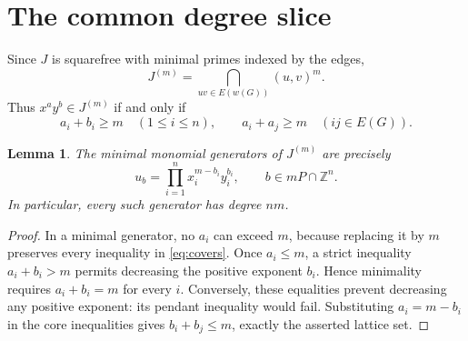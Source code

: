 \documentclass[11pt]{article}
\newtheorem{lemma}[theorem]{Lemma}
\theoremstyle{remark}
\newcommand{\ZZ}{\mathbb Z}
\begin{document}
\section{The common degree slice}

Since $J$ is squarefree with minimal primes indexed by the edges,
\[
J^{(m)}=\bigcap_{uv\in E(w(G))}(u,v)^m.
\]
Thus $x^ay^b\in J^{(m)}$ if and only if
\begin{equation}\label{eq:covers}
a_i+b_i\geq m\quad(1\leq i\leq n),\qquad
a_i+a_j\geq m\quad(ij\in E(G)).
\end{equation}

\begin{lemma}\label{lem:generators}
The minimal monomial generators of $J^{(m)}$ are precisely
\[
u_b=\prod_{i=1}^n x_i^{m-b_i}y_i^{b_i},
\qquad b\in mP\cap\ZZ^n.
\]
In particular, every such generator has degree $nm$.
\end{lemma}
\begin{proof}
In a minimal generator, no $a_i$ can exceed $m$, because replacing it by
$m$ preserves every inequality in \eqref{eq:covers}. Once $a_i\leq m$,
a strict inequality $a_i+b_i>m$ permits decreasing the positive exponent
$b_i$. Hence minimality requires $a_i+b_i=m$ for every $i$.
Conversely, these equalities prevent decreasing any positive exponent:
its pendant inequality would fail. Substituting $a_i=m-b_i$ in the core
inequalities gives $b_i+b_j\leq m$, exactly the asserted lattice set.
\end{proof}
\end{document}
